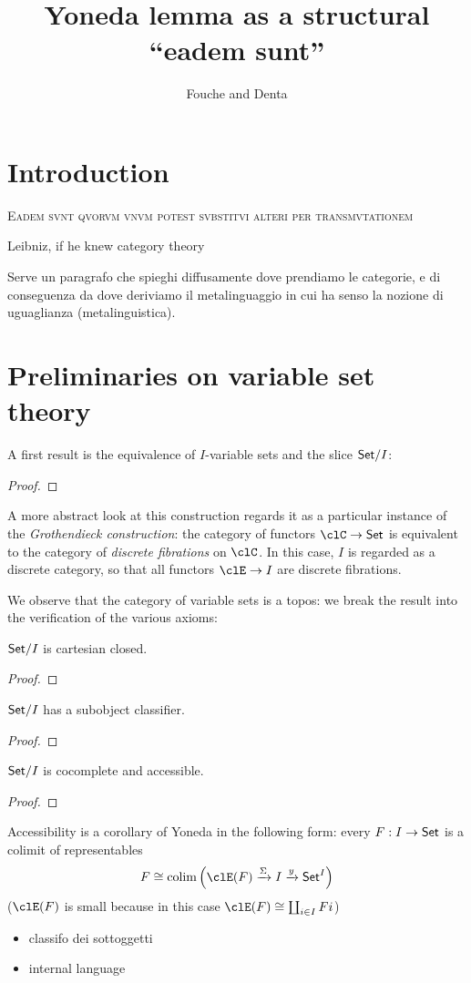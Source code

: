 \documentclass{amsart}
\author{Fouche and Denta}
\title{Yoneda lemma as a structural ``eadem sunt''}
\begin{document}
\maketitle
\section{Introduction}
\epigraph{\textsc{Eadem svnt qvorvm vnvm potest svbstitvi alteri per transmvtationem}}{Leibniz, if he knew category theory}
Serve un paragrafo che spieghi diffusamente dove prendiamo le categorie, e di conseguenza da dove deriviamo il metalinguaggio in cui ha senso la nozione di uguaglianza (metalinguistica).
\section{Preliminaries on variable set theory}
A first result is the equivalence of $I$-variable sets and the slice $\mathsf{Set}/I$: 
\begin{proposition}
  
\end{proposition}
\begin{proof}
  
\end{proof}
\begin{remark}
  A more abstract look at this construction regards it as a particular instance of the \emph{Grothendieck construction}: the category of functors $\clC\to\Set$ is equivalent to the category of \emph{discrete fibrations} on $\clC$. In this case, $I$ is regarded as a discrete category, so that all functors $\clE \to I$ are discrete fibrations.
\end{remark}
We observe that the category of variable sets is a topos: we break the result into the verification of the various axioms:
\begin{proposition}
$\mathsf{Set}/I$ is cartesian closed.
\end{proposition}
\begin{proof}
  
\end{proof}
\begin{proposition}
$\mathsf{Set}/I$ has a subobject classifier.
\end{proposition}
\begin{proof}
  
\end{proof}
\begin{proposition}
$\mathsf{Set}/I$ is cocomplete and accessible.
\end{proposition}
\begin{proof}
  
\end{proof}
Accessibility is a corollary of Yoneda in the following form: every $F : I \to \mathsf{Set}$ is a colimit of representables
\[
F \cong \colim\Big(\clE(F) \xto{\Sigma} I \xto{y} \Set^I\Big)  
\]
($\clE(F)$ is small because in this case $\clE(F)\cong\coprod_{i\in I}Fi$)
\begin{itemize}
  \item classifo dei sottoggetti
  \item internal language
\end{itemize}
\end{document}
